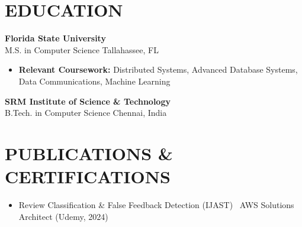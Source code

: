 \documentclass[letterpaper,10pt]{article}
\newcommand{\resumeItem}[1]{\item\small #1}
\newcommand{\resumeSubheading}[4]{
  \vspace{6pt}
  \noindent
  \textbf{#1} \hfill {\footnotesize #2} \\
  [-1pt]
  \noindent
  \small #3 \hfill {\small #4}
  \vspace{3pt}
}
\newcommand{\resumeItemsStart}{\vspace{-2pt}\begin{itemize}}
\newcommand{\resumeItemsEnd}{\end{itemize}\vspace{6pt}}
\begin{document}
\section{\textcolor{metablue}{EDUCATION}}
\vspace{-10pt}
\resumeSubheading
{Florida State University}{}
{M.S. in Computer Science}{Tallahassee, FL}
\resumeItemsStart
\resumeItem{\textbf{Relevant Coursework:} Distributed Systems, Advanced Database Systems, Data Communications, Machine Learning}
\resumeItemsEnd
\vspace{-5pt}
\resumeSubheading
{SRM Institute of Science \& Technology}{}
{B.Tech. in Computer Science}{Chennai, India}
\vspace{-10pt}

\section{\textcolor{metablue}{PUBLICATIONS \& CERTIFICATIONS}}
\vspace{-5pt}
\begin{itemize}
\resumeItem{Review Classification \& False Feedback Detection (IJAST) \textbar\ AWS Solutions Architect (Udemy, 2024)}
\end{itemize}
\end{document}
